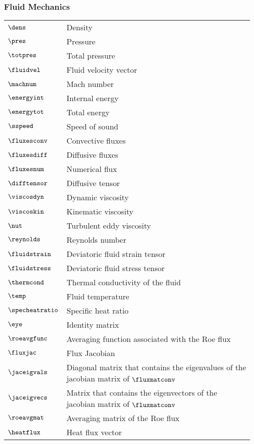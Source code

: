 \subsubsection*{Fluid Mechanics}
\begin{tabular}{l l}
$\dens$ & Density\\
$\pres$ & Pressure\\
$\totpres$ & Total pressure\\
$\fluidvel$ & Fluid velocity vector\\
$\machnum$ & Mach number\\
$\energyint$ & Internal energy\\
$\energytot$ & Total energy\\
$\sspeed$ & Speed of sound\\
$\fluxesconv$ & Convective fluxes\\
$\fluxesdiff$ & Diffusive fluxes\\
$\fluxesnum$ & Numerical flux\\
$\difftensor$ & Diffusive tensor\\
$\viscosdyn$ & Dynamic viscosity\\
$\viscoskin$ & Kinematic viscosity\\
$\nut$ & Turbulent eddy viscosity\\
$\reynolds$ & Reynolds number\\
$\fluidstrain$ & Deviatoric fluid strain tensor\\
$\fluidstress$ & Deviatoric fluid stress tensor\\
$\thermcond$ & Thermal conductivity of the fluid\\
$\temp$ & Fluid temperature\\
$\specheatratio$ & Specific heat ratio\\
$\eye$ & Identity matrix\\
$\roeavgfunc$ & Averaging function associated with the Roe flux\\
$\fluxjac$ & Flux Jacobian\\
$\jaceigvals$ & Diagonal matrix that contains the eigenvalues of the jacobian matrix of $\fluxmatconv$\\
$\jaceigvecs$ & Matrix that contains the eigenvectors of the jacobian matrix of $\fluxmatconv$\\
$\roeavgmat$ & Averaging matrix of the Roe flux\\
$\heatflux$ & Heat flux vector
\end{tabular}


